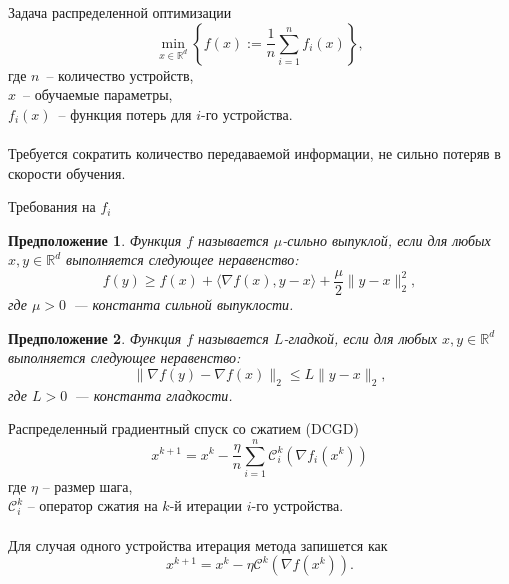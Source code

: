 \documentclass{beamer}
\newtheorem{myassumption}{Предположение}
\begin{document}
\begin{frame}{Задача распределенной оптимизации}
    \begin{equation}
     \min_{x \in \mathbb{R}^d}\left\{f(x) := \frac{1}{n}\sum\limits_{i = 1}^n f_i(x) \right\},
    \end{equation}
    где $n$~-- количество устройств,\\
    $x$~-- обучаемые параметры,\\
    $f_i(x)$~-- функция потерь для $i$-го устройства.\\

    $ $\\

    Требуется сократить количество передаваемой информации, не сильно потеряв в скорости обучения.

\end{frame}

\begin{frame}{Требования на $f_i$}
    \begin{myassumption}
        Функция $f$ называется $\mu$-сильно выпуклой, если для любых $x, y \in \mathbb{R}^d$ выполняется следующее неравенство:
        \begin{equation}
            f(y) \geq f(x) + \langle \nabla f(x), y - x \rangle + \frac{\mu}{2} \|y - x\|_2^2, \label{eq:strong_convexity}
        \end{equation}
        где $\mu > 0$~--- константа сильной выпуклости.
    \end{myassumption}

    \begin{myassumption}
        Функция $f$ называется $L$-гладкой, если для любых $x, y \in \mathbb{R}^d$ выполняется следующее неравенство:
        \begin{equation}
            \|\nabla f(y) - \nabla f(x)\|_2 \leq L \|y - x\|_2, \label{eq:smoothness}
        \end{equation}
        где $L > 0$~--- константа гладкости.
    \end{myassumption}
\end{frame}


\begin{frame}{Распределенный градиентный спуск со сжатием (DCGD)}
    \begin{equation}
     x^{k + 1} = x^k - \frac{\eta}{n} \sum\limits_{i = 1}^n\mathcal{C}_i^k(\nabla f_i(x^k))
    \end{equation}
    где $\eta$ -- размер шага,\\
    $\mathcal{C}_i^k$ -- оператор сжатия на $k$-й итерации $i$-го устройства.\\

    $ $\\
    Для случая одного устройства итерация метода запишется как
    \begin{equation}
     x^{k + 1} = x^k - \eta\mathcal{C}^k(\nabla f(x^k)).
    \end{equation}
\end{frame}
\end{document}
